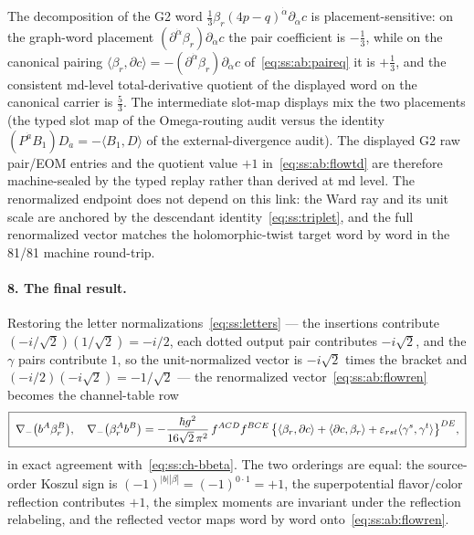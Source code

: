 \begin{remark}\label{rem:ss:ab:slotmap}
The decomposition of the G2 word $\tfrac13\beta_r(4p-q)^{\dot\alpha}\partial_{\dot\alpha}c$ is placement-sensitive: on the graph-word placement $(\partial^{\dot\alpha}\beta_r)\partial_{\dot\alpha}c$ the pair coefficient is $-\tfrac13$, while on the canonical pairing $\langle\beta_r,\partial c\rangle=-(\partial^{\dot\alpha}\beta_r)\partial_{\dot\alpha}c$ of~\eqref{eq:ss:ab:paireq} it is $+\tfrac13$, and the consistent md-level total-derivative quotient of the displayed word on the canonical carrier is $\tfrac53$. The intermediate slot-map displays mix the two placements (the typed slot map of the Omega-routing audit versus the identity $(P^{\dot a}B_1)D_{\dot a}=-\langle B_1,D\rangle$ of the external-divergence audit). The displayed G2 raw pair/EOM entries and the quotient value $+1$ in~\eqref{eq:ss:ab:flowtd} are therefore machine-sealed by the typed replay rather than derived at md level. The renormalized endpoint does not depend on this link: the Ward ray and its unit scale are anchored by the descendant identity~\eqref{eq:ss:triplet}, and the full renormalized vector matches the holomorphic-twist target word by word in the 81/81 machine round-trip.
\end{remark}

\paragraph{8. The final result.} Restoring the letter normalizations~\eqref{eq:ss:letters} --- the insertions contribute $(-i/\sqrt2)(1/\sqrt2)=-i/2$, each dotted output pair contributes $-i\sqrt2$, and the $\gamma$ pairs contribute $1$, so the unit-normalized vector is $-i\sqrt2$ times the bracket and $(-i/2)(-i\sqrt2)=-1/\sqrt2$ --- the renormalized vector~\eqref{eq:ss:ab:flowren} becomes the channel-table row
\begin{equation}\label{eq:ss:ab:result}
\boxed{\;
\nabla_{-}\big(b^{A}\beta_r^{B}\big),\quad
\nabla_{-}\big(\beta_r^{A}b^{B}\big)
=-\frac{\hbar g^{2}}{16\sqrt2\,\pi^{2}}\,f^{ACD}f^{BCE}\,
\big\{\langle\beta_{r},\partial c\rangle
+\langle\partial c,\beta_{r}\rangle
+\varepsilon_{rst}\langle\gamma^{s},\gamma^{t}\rangle\big\}^{DE} ,\;}
\end{equation}
in exact agreement with~\eqref{eq:ss:ch-bbeta}. The two orderings are equal: the source-order Koszul sign is $(-1)^{|b||\beta|}=(-1)^{0\cdot1}=+1$, the superpotential flavor/color reflection contributes $+1$, the simplex moments are invariant under the reflection relabeling, and the reflected vector maps word by word onto~\eqref{eq:ss:ab:flowren}.

